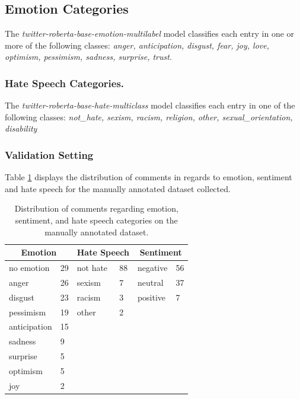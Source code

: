 \subsection{Emotion Categories}
\label{sec:triggers-emotion-list}
The \textit{twitter-roberta-base-emotion-multilabel} model classifies each entry in one or more of the following classes:
\textit{anger, anticipation, disgust, fear, joy, love, optimism, pessimism, sadness, surprise, trust}.

\subsubsection{Hate Speech Categories.}
\label{sec:triggers-hate-list}
The \textit{twitter-roberta-base-hate-multiclass}  model classifies each entry in one of the following classes: \textit{not\_hate, sexism, racism, religion, other, sexual\_orientation, disability}

\subsubsection{Validation Setting}
\label{sec:validation}
Table \ref{tab:annotated_data} displays the distribution of comments in regards to emotion, sentiment and hate speech for the manually annotated dataset collected.

\begin{table}[ht]
\centering
\begin{tabular}{llll|ll}
\multicolumn{2}{c|}{Emotion}            & \multicolumn{2}{c|}{Hate Speech}       & \multicolumn{2}{c}{Sentiment}         \\ \hline
no emotion & \multicolumn{1}{l|}{29} & not hate     & 88     & negative     & 56    \\
anger      & \multicolumn{1}{l|}{26} & sexism       & 7      & neutral      & 37    \\
disgust    & \multicolumn{1}{l|}{23} & racism       & 3      & positive     & 7     \\
pessimism    & \multicolumn{1}{l|}{19} & other                & 2               & \multicolumn{2}{l}{\multirow{6}{*}{}} \\
anticipation & \multicolumn{1}{l|}{15} & \multicolumn{2}{l|}{\multirow{5}{*}{}} & \multicolumn{2}{l}{}                  \\
sadness    & \multicolumn{1}{l|}{9}  & \multicolumn{2}{l|}{} & \multicolumn{2}{l}{} \\
surprise   & \multicolumn{1}{l|}{5}  & \multicolumn{2}{l|}{} & \multicolumn{2}{l}{} \\
optimism   & \multicolumn{1}{l|}{5}  & \multicolumn{2}{l|}{} & \multicolumn{2}{l}{} \\
joy        & \multicolumn{1}{l|}{2}  & \multicolumn{2}{l|}{} & \multicolumn{2}{l}{}
\end{tabular}
\caption{Distribution of comments regarding emotion, sentiment, and hate speech categories on the manually annotated dataset.}
\label{tab:annotated_data}
\end{table}

